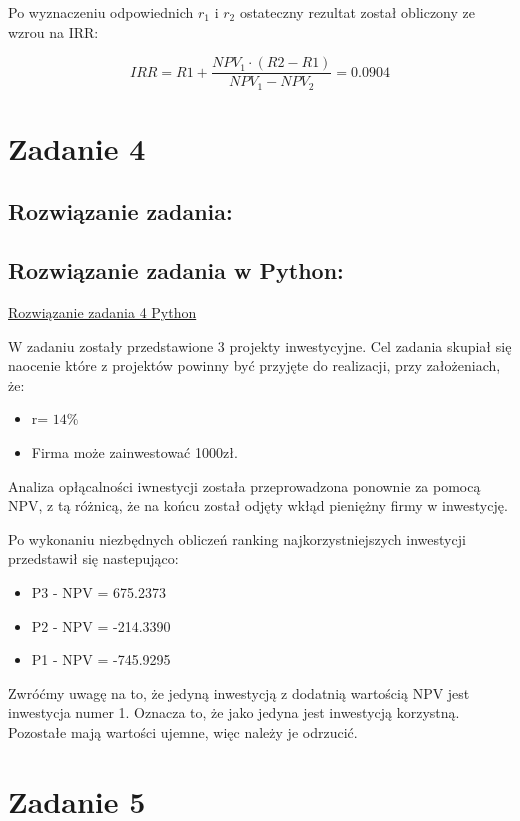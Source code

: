 \documentclass{article}
\begin{document}
	Po wyznaczeniu odpowiednich $r_1$ i $r_2$ ostateczny rezultat został obliczony ze wzrou na IRR:
	
	$$ IRR = R1 + \frac{NPV_1\cdot(R2-R1)}{NPV_1-NPV_2}= 0.0904 $$ 
	
	\newpage
	\section*{Zadanie 4}
	
	
	\subsection*{Rozwiązanie zadania:}
	
	
	\subsection*{Rozwiązanie zadania w Python:}
	\href{https://github.com/slaw999999999/OEI/blob/main/Zadanie1.ipynb}{Rozwiązanie zadania 4 Python}
	
	W zadaniu zostały przedstawione 3 projekty inwestycyjne. Cel zadania skupiał się naocenie które z projektów powinny być przyjęte do realizacji, przy założeniach, że:
	
	\begin{itemize}
		\item
		 r= $14\%$
		\item
		 Firma może zainwestować 1000zł.	
	\end{itemize}
	
	
	Analiza opłącalności iwnestycji została przeprowadzona ponownie za pomocą NPV, z tą różnicą, że na końcu został odjęty wkłąd pieniężny firmy w inwestycję.
	
	Po wykonaniu niezbędnych obliczeń ranking najkorzystniejszych inwestycji przedstawił się nastepująco:
	\begin{itemize}
		\item 
		P3 - NPV = 675.2373
		\item 
		P2 - NPV = -214.3390
		\item
		P1 - NPV = -745.9295
	\end{itemize}

	Zwróćmy uwagę na to, że jedyną inwestycją z dodatnią wartością NPV jest inwestycja numer 1. Oznacza to, że jako jedyna jest inwestycją korzystną. Pozostałe mają wartości ujemne, więc należy  je odrzucić.
	\newpage
	\section*{Zadanie 5}
	
\end{document}
